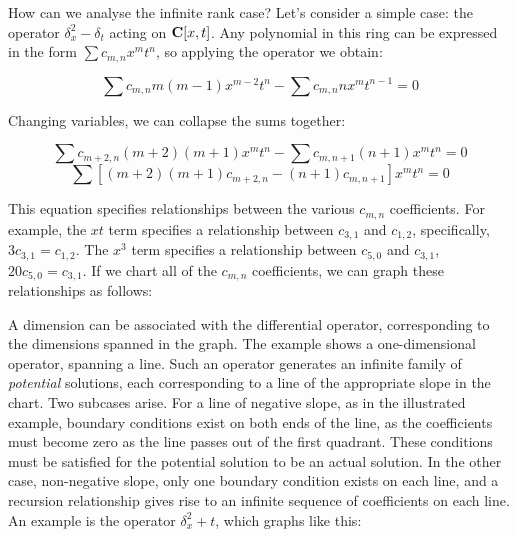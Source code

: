 \documentclass{article}
\newcommand{\C}{\ensuremath{{\bf C}}}
\begin{document}
How can we analyse the infinite rank case?  Let's consider a simple
case: the operator $\delta_x^2 - \delta_t$ acting on $\C[x,t]$.
Any polynomial in this ring can be expressed in the form $\sum c_{m,n} x^m t^n$,
so applying the operator we obtain:

$$\sum c_{m,n} m(m-1) x^{m-2} t^n - \sum c_{m,n} n x^m t^{n-1} = 0$$

Changing variables, we can collapse the sums together:

$$\sum c_{m+2,n} (m+2)(m+1) x^m t^n - \sum c_{m,n+1} (n+1) x^m t^n = 0$$
$$\sum \left[  (m+2)(m+1) c_{m+2,n} -  (n+1) c_{m,n+1} \right] x^m t^n = 0$$

This equation specifies relationships between the various $c_{m,n}$
coefficients.  For example, the $xt$ term specifies a relationship
between $c_{3,1}$ and $c_{1,2}$, specifically, $3c_{3,1}=c_{1,2}$.
The $x^3$ term specifies a relationship between $c_{5,0}$ and $c_{3,1}$,
$20c_{5,0} = c_{3,1}$.
If we chart all of the $c_{m,n}$ coefficients, we can graph these
relationships as follows:

\def\tikzcoefficientgraph{
\pgftransformscale{0.5}
\foreach \x in {0,...,5}
   \foreach \y in {0,...,5}
      \draw (\x,\y) node {.};

\foreach \x in {2,...,5}
   \draw (\x,-1) node [anchor=base] {$x^\x$};
\draw (1,-1) node [anchor=base] {$x$};
\draw (0,-1) node [anchor=base] {1};
\foreach \y in {2,...,5}
   \draw (-0.5,\y) node {$t^\y$};
\draw (-0.5,1) node {$t$};
\draw (-0.5,0) node {1};
}

\begin{center}
\end{center}

A dimension can be associated with the differential operator,
corresponding to the dimensions spanned in the graph.  The example
shows a one-dimensional operator, spanning a line.  Such an operator
generates an infinite family of {\it potential} solutions, each
corresponding to a line of the appropriate slope in the chart.  Two
subcases arise.  For a line of negative slope, as in the illustrated
example, boundary conditions exist on both ends of the line, as the
coefficients must become zero as the line passes out of the first
quadrant.  These conditions must be satisfied for the potential
solution to be an actual solution.  In the other case, non-negative
slope, only one boundary condition exists on each line, and a
recursion relationship gives rise to an infinite sequence of
coefficients on each line.  An example is the operator $\delta_x^2+t$,
which graphs like this:
\end{document}
